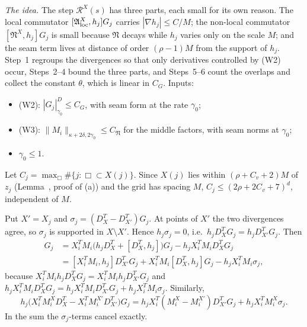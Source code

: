 \begin{detail}\label{d9:step-small}
\emph{The idea.} The step $\mathcal R^X(s)$ has three parts, each small for its own reason. The local commutator $[\mathfrak A^X_{\rm loc},h_j]G_j$ carries $|\nabla h_j|\le C/M$; the non-local commutator $[\mathfrak N^X,h_j]G_j$ is small because $\mathfrak N$ decays while $h_j$ varies only on the scale $M$; and the seam term lives at distance of order $(\rho-1)M$ from the support of $h_j$. Step~1 regroups the divergences so that only derivatives controlled by (W2) occur, Steps~2--4 bound the three parts, and Steps~5--6 count the overlaps and collect the constant $\theta$, which is linear in $C_G$.
Inputs:
\begin{itemize}
\item (W2): $|G_j|^D_{\gamma_0}\le C_G$, with seam form at the rate $\gamma_0$;
\item (W3): $\|M_i\|_{\kappa+2\delta,2\gamma_0}\le C_{\mathfrak N}$ for the middle factors, with seam norms at $\gamma_0$;
\item $\gamma_0\le1$.
\end{itemize}
Let $C_j=\max_\Box\#\{j:\Box\subset X(j)\}$. Since $X(j)$ lies within $(\rho+C_v+2)M$ of $z_j$ (Lemma~, proof of (a)) and the grid has spacing $M$, $C_j\le(2\rho+2C_v+7)^d$, independent of $M$.
\begin{step}
Put $X'=X_j$ and $\sigma_j=(D^T_X-D^T_{X'})G_j$. At points of $X'$ the two divergences agree, so $\sigma_j$ is supported in $X\setminus X'$. Hence $h_j\sigma_j=0$, i.e.\ $h_jD^T_XG_j=h_jD^T_{X'}G_j$. Then
\begin{align*}
[X_i^TM_iD^T_X,h_j]G_j&=X_i^TM_i\big(h_jD^T_X+[D^T_X,h_j]\big)G_j-h_jX_i^TM_iD^T_XG_j\\
&=[X_i^TM_i,h_j]D^T_{X'}G_j+X_i^TM_i[D^T_X,h_j]G_j-h_jX_i^TM_i\sigma_j ,
\end{align*}
because $X_i^TM_ih_jD^T_XG_j=X_i^TM_ih_jD^T_{X'}G_j$ and $h_jX_i^TM_iD^T_XG_j=h_jX_i^TM_iD^T_{X'}G_j+h_jX_i^TM_i\sigma_j$. Similarly,
\[
h_j\big(X_i^TM^X_iD^T_X-X_i^TM^{X'}_iD^T_{X'}\big)G_j=h_jX_i^T(M^X_i-M^{X'}_i)D^T_{X'}G_j+h_jX_i^TM^X_i\sigma_j .
\]
In the sum the $\sigma_j$-terms cancel exactly.


\end{step}
\end{detail}
